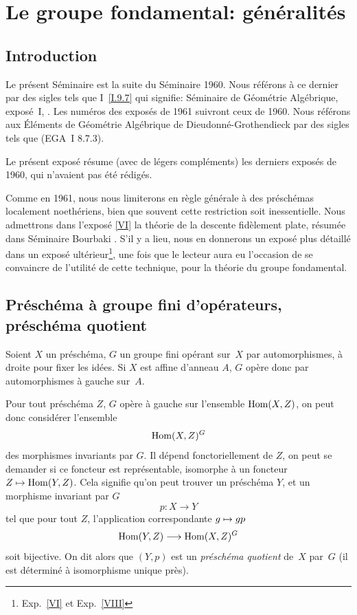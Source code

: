 \chapter{Le groupe fondamental: g\'en\'eralit\'es}
\label{V}

\setcounter{section}{-1}
\section{Introduction}

Le pr\'esent S\'eminaire est la suite du S\'eminaire 1960. Nous
r\'ef\'erons \`a ce dernier par des sigles tels que I~\ref{I.9.7}
qui signifie: S\'eminaire de G\'eom\'etrie Alg\'ebrique,
expos\'e~I, . Les num\'eros des expos\'es de 1961 suivront
ceux de 1960. Nous r\'ef\'erons aux \'El\'ements de
G\'eom\'etrie Alg\'ebrique de Dieudonn\'e-Grothendieck par des
sigles tels que (EGA~I 8.7.3).

Le pr\'esent expos\'e r\'esume (avec de l\'egers
compl\'ements) les derniers expos\'es de 1960, qui n'avaient pas
\'et\'e r\'edig\'es.

Comme en 1961, nous nous limiterons en r\`egle g\'en\'erale
\`a des pr\'esch\'emas localement noeth\'eriens, bien que
souvent cette restriction soit inessentielle. Nous admettrons dans
l'expos\'e \ref{VI} la th\'eorie de la descente fid\`element plate,
r\'esum\'ee dans S\'eminaire Bourbaki . S'il y a lieu,
nous en donnerons un expos\'e plus d\'etaill\'e dans un
expos\'e ult\'erieur\footnote{\Cf Exp.\, \ref{VI} et Exp.\, \ref{VIII}}, une fois
que le lecteur aura eu l'occasion de se convaincre de l'utilit\'e de
cette technique, pour la th\'eorie du groupe fondamental.

\section{Pr\'esch\'ema \`a groupe fini d'op\'erateurs,
pr\'esch\'ema quotient}
\label{V.1}

Soient $X$ un pr\'esch\'ema, $G$ un groupe fini op\'erant sur~$X$ par automorphismes, \`a droite pour fixer les id\'ees. Si $X$
est affine d'anneau $A$, $G$ op\`ere donc par automorphismes \`a
gauche sur~$A$.

Pour tout pr\'esch\'ema $Z$, $G$ op\`ere \`a gauche sur
l'ensemble $\operatorname{Hom}(X,Z)$,
on peut donc consid\'erer l'ensemble
$$
\operatorname{Hom}(X,Z)^G
$$
des morphismes invariants par $G$. Il d\'epend fonctoriellement de
$Z$,
on peut se demander si ce foncteur est \og repr\'esentable\fg,
\ie isomorphe \`a un foncteur $Z\mto\Hom(Y,Z)$.
Cela signifie qu'on peut trouver un pr\'esch\'ema $Y$, et un
morphisme invariant par $G$
$$
p\colon X\to Y
$$
tel que pour tout $Z$, l'application correspondante $g\mto gp$
$$
\Hom(Y,Z)\to \Hom(X,Z)^G
$$
soit bijective. On dit alors que $(Y,p)$ est un
\emph{préschéma quotient}
de~$X$
par~$G$
(il est d\'etermin\'e \`a isomorphisme unique pr\`es).

